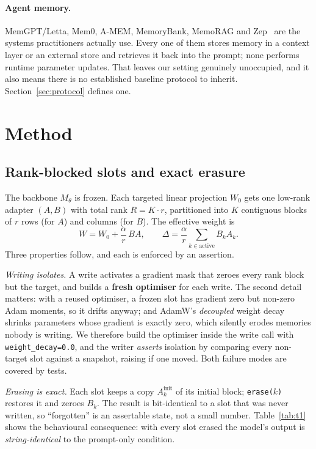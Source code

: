 \documentclass[11pt]{article}
\begin{document}
\paragraph{Agent memory.} MemGPT/Letta, Mem0, A-MEM, MemoryBank, MemoRAG and
Zep~\cite{memgpt,mem0,amem,memorybank,memoRAG,zep} are the systems practitioners
actually use. Every one of them stores memory in a context layer or an external
store and retrieves it back into the prompt; none performs runtime parameter
updates. That leaves our setting genuinely unoccupied, and it also means there is no established baseline protocol to inherit. Section~\ref{sec:protocol} defines one.

\section{Method}
\label{sec:method}

\subsection{Rank-blocked slots and exact erasure}



The backbone $M_\theta$ is frozen. Each targeted linear projection $W_0$ gets one
low-rank adapter $(A, B)$ with total rank $R = K \cdot r$, partitioned into $K$
contiguous blocks of $r$ rows (for $A$) and columns (for $B$). The effective
weight is
\begin{equation}
W = W_0 + \frac{\alpha}{r} \, B A , \qquad
\Delta = \frac{\alpha}{r}\sum_{k \in \mathrm{active}} B_k A_k .
\end{equation}
Three properties follow, and each is enforced by an assertion.

\emph{Writing isolates.} A write activates a gradient mask that zeroes every rank
block but the target, and builds a \textbf{fresh optimiser} for each write.
The second detail matters: with a reused optimiser, a frozen slot has gradient
zero but non-zero Adam moments, so it drifts anyway; and AdamW's \emph{decoupled}
weight decay shrinks parameters whose gradient is exactly zero, which silently
erodes memories nobody is writing. We therefore build the optimiser inside the
write call with \texttt{weight\_decay=0.0}, and the writer \emph{asserts}
isolation by comparing every non-target slot against a snapshot, raising if one
moved. Both failure modes are covered by tests.

\emph{Erasing is exact.} Each slot keeps a copy $A^{\mathrm{init}}_k$ of its
initial block; \texttt{erase($k$)} restores it and zeroes $B_k$. The result is
bit-identical to a slot that was never written, so ``forgotten'' is an assertable
state, not a small number. Table~\ref{tab:t1} shows the behavioural consequence:
with every slot erased the model's output is \emph{string-identical} to the
prompt-only condition.
\end{document}
